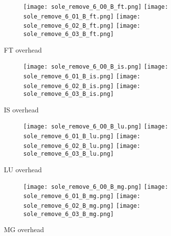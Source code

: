 \documentclass[11pt]{article}
\begin{document}
    \begin{figure}[!htb]
        \begin{subfigure}{\linewidth}
            \texttt{[image: sole\_remove\_6\_O0\_B\_ft.png]}
            \texttt{[image: sole\_remove\_6\_O1\_B\_ft.png]}
            \texttt{[image: sole\_remove\_6\_O2\_B\_ft.png]}
            \texttt{[image: sole\_remove\_6\_O3\_B\_ft.png]}
        \end{subfigure}\par\medskip
        \caption{FT overhead}
    \end{figure}
\begin{figure}[!htb]
        \begin{subfigure}{\linewidth}
            \texttt{[image: sole\_remove\_6\_O0\_B\_is.png]}\hfill
            \texttt{[image: sole\_remove\_6\_O1\_B\_is.png]}\hfill
            \texttt{[image: sole\_remove\_6\_O2\_B\_is.png]}\hfill
            \texttt{[image: sole\_remove\_6\_O3\_B\_is.png]}\hfill
        \end{subfigure}\par\medskip
        \caption{IS overhead}
\end{figure}

    \begin{figure}[!htb]
        \begin{subfigure}{\linewidth}
            \texttt{[image: sole\_remove\_6\_O0\_B\_lu.png]}\hfill
            \texttt{[image: sole\_remove\_6\_O1\_B\_lu.png]}\hfill
            \texttt{[image: sole\_remove\_6\_O2\_B\_lu.png]}\hfill
            \texttt{[image: sole\_remove\_6\_O3\_B\_lu.png]}\hfill
        \end{subfigure}\par\medskip
        \caption{LU overhead}
    \end{figure}

    \begin{figure}[!htb]
        \begin{subfigure}{\linewidth}
            \texttt{[image: sole\_remove\_6\_O0\_B\_mg.png]}\hfill
            \texttt{[image: sole\_remove\_6\_O1\_B\_mg.png]}\hfill
            \texttt{[image: sole\_remove\_6\_O2\_B\_mg.png]}\hfill
            \texttt{[image: sole\_remove\_6\_O3\_B\_mg.png]}\hfill
        \end{subfigure}\par\medskip
        \caption{MG overhead}
    \end{figure}
\end{document}
